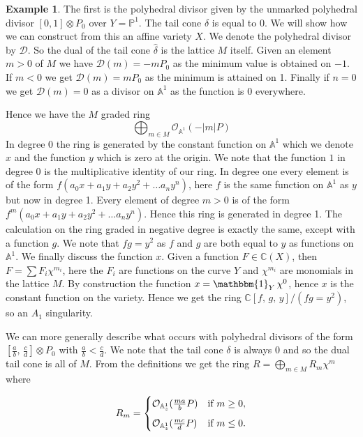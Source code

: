 \documentclass[12pt,a4paper]{book}      %
\theoremstyle{definition}
\newtheorem{ex}[thm]{Example}
\newcommand{\mb}[1]{\mathbb{#1}}
\begin{document}
\begin{ex}\label{ToricDowngrade}
The first is the polyhedral divisor given by the unmarked polyhedral divisor $[0, 1] \otimes P_0$ over $Y = \mb{P}^1$. 
The tail cone $\delta$ is equal to $0$. We will show how we can construct from this an affine variety $X$. We denote the polyhedral divisor by $\mathcal{D}$. So the dual of the tail cone $\hat{\delta}$ is the lattice $M$ itself. Given an element $ m >0$ of $M$ we have $\mathcal{D}(m) = -mP_0$ as the minimum value is obtained on $-1$. If $m <0$ we get $\mathcal{D}(m) = mP_0$  as the minimum is attained on 1. Finally if $n=0$ we get $\mathcal{D}(m) = 0$ as a divisor on $\mathbb{A}^1$ as the function is 0 everywhere. 


Hence we have the $M$ graded ring
\[
\bigoplus_{m \in M} \mathcal{O}_{\mathbb{A}^1}(-|m|P)
\]
In degree 0 the ring is generated by the constant function on $\mb{A}^1$ which we denote $x$ and the function $y$ which is zero at the origin. We note that the function $1$ in degree 0 is the multiplicative identity of our ring. In degree one every element is of the form $f ( a_0 x + a_1 y + a_2 y^2 + \dots  a_n y^n)$, here $f$ is the same function on $\mb{A}^1$ as $y$ but now in degree 1. Every element of degree $m>0$ is of the form $f^m ( a_0 x + a_1 y + a_2 y^2 + \dots  a_n y^n)$. Hence this ring is generated in degree 1. The calculation on the ring graded in negative degree is exactly the same, except with a function $g$.  We note that $fg = y^2$ as $f$ and $g$ are both equal to $y$ as functions on $\mb{A}^1$. We finally discuss the function $x$. Given a function $F \in \mb{C}(X)$, then $F = \sum F_i \chi^{m_i}$, here the $F_i$ are functions on the curve $Y$ and $\chi^{m_i}$ are monomials in the lattice $M$. By construction the function $x = \mathbbm{1}_{Y} \, \chi^0$, hence $x$ is the constant function on the variety. Hence we get the ring $\mathbb{C}[f,  \, g, \, y]/ (fg=y^2)$, so an $A_1$ singularity.
\end{ex}

We can more generally describe what occurs with polyhedral divisors of the form $[\frac{a}{b}, \, \frac{c}{d}] \otimes P_0$ with $\frac{a}{b} < \frac{c}{d}$. We note that the tail cone $\delta$ is always 0 and so the dual tail cone is all of $M$. From the definitions we get the ring $R = \bigoplus_{m \in M} R_m \chi^m$ where

\[
R_m = 
\begin{cases}
\mathcal{O}_{\mb{A}_z^1} ( \frac{ma}{b}P) & \text{if } m \geq 0,  \vspace{0.2cm} \\
\mathcal{O}_{\mb{A}_z^1} ( \frac{mc}{d}P) & \text{if } m \leq 0.
\end{cases}
\]
\end{document}
